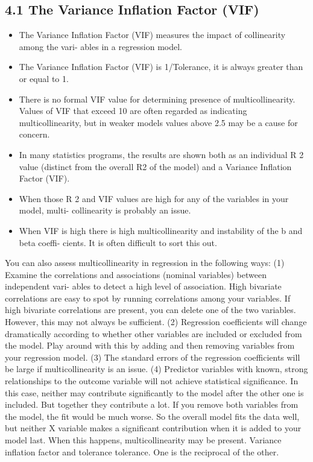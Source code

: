 \documentclass[a4paper,12pt]{article}
\begin{document}
\subsection{4.1 The Variance Inflation Factor (VIF)}
\begin{itemize}
\item The Variance Inflation Factor (VIF) measures the impact of collinearity among the vari-
ables in a regression model.
\item The Variance Inflation Factor (VIF) is 1/Tolerance, it is always greater than or equal to
1.
\item There is no formal VIF value for determining presence of multicollinearity. Values of VIF
that exceed 10 are often regarded as indicating multicollinearity, but in weaker models
values above 2.5 may be a cause for concern.
\item In many statistics programs, the results are shown both as an individual R 2 value (distinct
from the overall R2 of the model) and a Variance Inflation Factor (VIF).
\item When those R 2 and VIF values are high for any of the variables in your model, multi-
collinearity is probably an issue.
\item When VIF is high there is high multicollinearity and instability of the b and beta coeffi-
cients. It is often difficult to sort this out.
\end{itemize}
You can also assess multicollinearity in regression in the following ways:
(1) Examine the correlations and associations (nominal variables) between independent vari-
ables to detect a high level of association. High bivariate correlations are easy to spot by
running correlations among your variables. If high bivariate correlations are present, you
can delete one of the two variables. However, this may not always be sufficient.
(2) Regression coefficients will change dramatically according to whether other variables are
included or excluded from the model. Play around with this by adding and then removing
variables from your regression model.
(3) The standard errors of the regression coefficients will be large if multicollinearity is an
issue.
(4) Predictor variables with known, strong relationships to the outcome variable will not
achieve statistical significance. In this case, neither may contribute significantly to the
model after the other one is included. But together they contribute a lot. If you remove
both variables from the model, the fit would be much worse. So the overall model fits
the data well, but neither X variable makes a significant contribution when it is added to
your model last. When this happens, multicollinearity may be present.
Variance inflation factor and tolerance tolerance. One is the reciprocal of the other.
\end{document}
